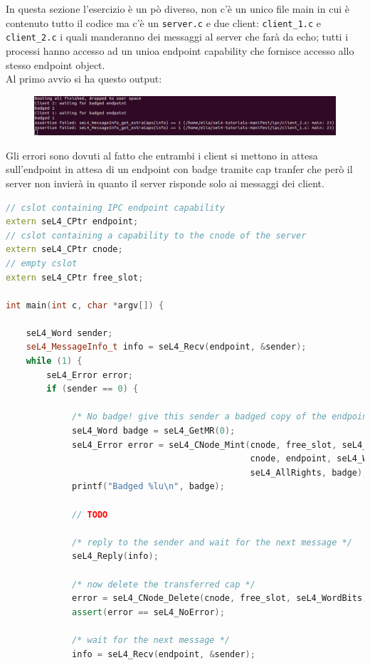 In questa sezione l'esercizio è un pò diverso, non c'è un unico file main in cui è contenuto tutto il codice ma c'è un \texttt{server.c} e due client: \texttt{client\_1.c} e \texttt{client\_2.c} i quali manderanno dei messaggi al server che farà da echo; tutti i processi hanno accesso ad un unioa endpoint capability che fornisce accesso allo stesso endpoint object.\\
Al primo avvio si ha questo output:
\begin{figure}[H]
  \includegraphics[width=\linewidth]{img/PrimoAvvioIPC.png}
  \label{fig:PrimoAvvio}
\end{figure}
Gli errori sono dovuti al fatto che entrambi i client si mettono in attesa sull'endpoint in attesa di un endpoint con badge tramite cap tranfer che però il server non invierà in quanto il server risponde solo ai messaggi dei client.
\begin{lstlisting}[language=C++]
// cslot containing IPC endpoint capability
extern seL4_CPtr endpoint;
// cslot containing a capability to the cnode of the server
extern seL4_CPtr cnode;
// empty cslot
extern seL4_CPtr free_slot;

int main(int c, char *argv[]) {

	seL4_Word sender;
    seL4_MessageInfo_t info = seL4_Recv(endpoint, &sender);
    while (1) {
	    seL4_Error error;
        if (sender == 0) {

             /* No badge! give this sender a badged copy of the endpoint */
             seL4_Word badge = seL4_GetMR(0);
             seL4_Error error = seL4_CNode_Mint(cnode, free_slot, seL4_WordBits,
                                                cnode, endpoint, seL4_WordBits,
                                                seL4_AllRights, badge);
             printf("Badged %lu\n", badge);

             // TODO
             
             /* reply to the sender and wait for the next message */
             seL4_Reply(info);

             /* now delete the transferred cap */
             error = seL4_CNode_Delete(cnode, free_slot, seL4_WordBits);
             assert(error == seL4_NoError);

             /* wait for the next message */
             info = seL4_Recv(endpoint, &sender);
\end{lstlisting}
